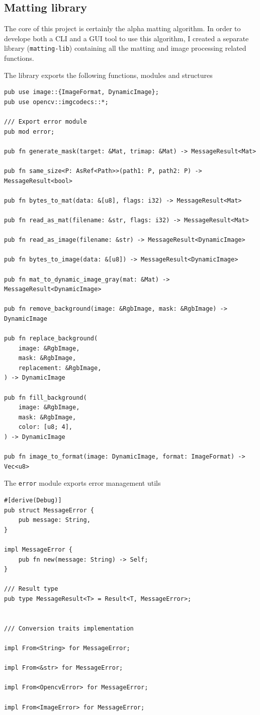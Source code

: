 \documentclass[a4paper]{article}
\begin{document}
\subsection{Matting library}

The core of this project is certainly the alpha matting algorithm.
In order to develope both a CLI and a GUI tool to
use this algorithm, I created a separate library (\texttt{matting-lib})
containing all the matting and image processing related functions.

The library exports the following functions, modules and structures

\begin{lstlisting}[style=Rust, style=boxed]
pub use image::{ImageFormat, DynamicImage};
pub use opencv::imgcodecs::*;

/// Export error module
pub mod error;

pub fn generate_mask(target: &Mat, trimap: &Mat) -> MessageResult<Mat>

pub fn same_size<P: AsRef<Path>>(path1: P, path2: P) -> MessageResult<bool>

pub fn bytes_to_mat(data: &[u8], flags: i32) -> MessageResult<Mat>

pub fn read_as_mat(filename: &str, flags: i32) -> MessageResult<Mat>

pub fn read_as_image(filename: &str) -> MessageResult<DynamicImage>

pub fn bytes_to_image(data: &[u8]) -> MessageResult<DynamicImage>

pub fn mat_to_dynamic_image_gray(mat: &Mat) -> MessageResult<DynamicImage>

pub fn remove_background(image: &RgbImage, mask: &RgbImage) -> DynamicImage

pub fn replace_background(
    image: &RgbImage,
    mask: &RgbImage,
    replacement: &RgbImage,
) -> DynamicImage

pub fn fill_background(
    image: &RgbImage,
    mask: &RgbImage,
    color: [u8; 4],
) -> DynamicImage

pub fn image_to_format(image: DynamicImage, format: ImageFormat) -> Vec<u8>
\end{lstlisting}

The \texttt{error} module exports error management utils

\begin{lstlisting}[style=Rust, style=boxed]
#[derive(Debug)]
pub struct MessageError {
    pub message: String,
}

impl MessageError {
    pub fn new(message: String) -> Self;
}

/// Result type
pub type MessageResult<T> = Result<T, MessageError>;


/// Conversion traits implementation

impl From<String> for MessageError;

impl From<&str> for MessageError;

impl From<OpencvError> for MessageError;

impl From<ImageError> for MessageError;
\end{lstlisting}
\end{document}
